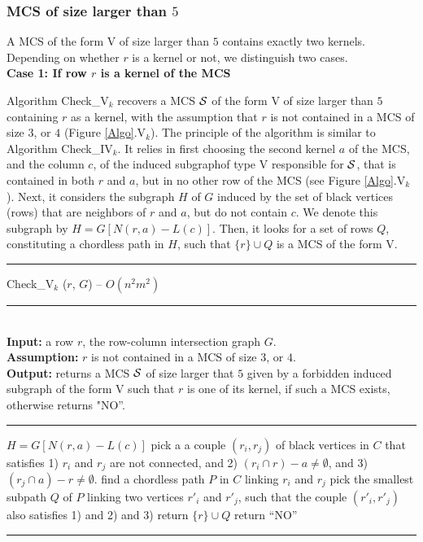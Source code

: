 \documentclass{article}
\begin{document}
\subsubsection{MCS of size larger than $5$}

A MCS of the form V of size larger than $5$ contains exactly two kernels.
Depending on whether $r$ is a kernel or not, we distinguish two cases.\\


{\bf Case 1: If row $r$ is a kernel of the MCS}

Algorithm \mbox{Check\_V$_k$} recovers a MCS ${\cal S}$ of the form V of size 
larger than $5$ containing $r$ as a kernel, with the assumption that  $r$ 
is not contained in a MCS of size $3$, or $4$ (Figure \ref{Algo}.V$_k$).
The principle of the algorithm is similar to Algorithm \mbox{Check\_IV$_k$}. 
It relies in first choosing the second kernel $a$ of the MCS, and the column 
$c$, of the induced subgraphof type V responsible for ${\cal S}$, that is 
contained in both $r$ and $a$, but in no other row of the MCS  
(see Figure \ref{Algo}.V$_k$).
Next, it considers the subgraph $H$ of $G$ induced by the set of black 
vertices (rows) that are neighbors of $r$ and $a$, but do not contain 
$c$. We denote this subgraph by $H = G[N(r,a)-L(c)]$. Then, it looks for 
a set of rows $Q$, constituting a chordless path in $H$,
 such that $\{r\}\cup Q$ is a MCS of the form V.


\begin{algorithm}[htpb]                      
\rule{11.7cm}{0.01cm}
\caption{Check\_V$_k$ ($r$, $G$) -- $O(n^2m^2)$} 
\rule{11.7cm}{0.01cm}
\\
{\bf Input:} a row $r$, the row-column intersection graph $G$.\\
{\bf Assumption:}  $r$ is not contained in a MCS of size $3$, or $4$.\\
{\bf Output:} returns a MCS ${\cal S}$ of size larger that $5$ given by a 
forbidden induced subgraph of the form V such that $r$ is one of its kernel,
if such a MCS exists, otherwise returns  "NO''.
\rule{11.7cm}{0.01cm}
\begin{algorithmic}[1]
\STATE $H = G[N(r,a)-L(c)]$
\STATE pick a a couple $(r_i,r_j)$ of black vertices in $C$ that satisfies 
1) $r_i$ and $r_j$ are not connected, and 2) $(r_i\cap r) - a \neq \emptyset$, 
and 3) $(r_j\cap a) - r \neq \emptyset$.
\STATE find a chordless path $P$ in $C$ linking $r_i$ and $r_j$
\STATE pick the smallest subpath $Q$ of $P$ linking two vertices $r'_i$ and 
$r'_j$, such that the couple $(r'_i,r'_j)$ also satisfies 1) and 2) and 3)
\STATE return $\{r\}\cup Q$
\ENDFOR
\ENDFOR
\ENDFOR
\STATE return ``NO''
\end{algorithmic}
\rule{11.7cm}{0.01cm}
\end{algorithm}
\end{document}
